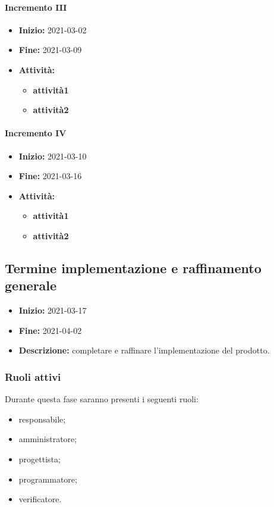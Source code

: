 \paragraph[Incremento III]{Incremento III}
\begin{itemize}
    \item [] \textbf{Inizio:} 2021-03-02
    \item [] \textbf{Fine:} 2021-03-09
    \item [] \textbf{Attività:}
          \begin{itemize}
            \item \textbf{attività1}
            \item \textbf{attività2}
          \end{itemize}
\end{itemize}

\paragraph[Incremento IV]{Incremento IV}
\begin{itemize}
    \item [] \textbf{Inizio:} 2021-03-10
    \item [] \textbf{Fine:} 2021-03-16
    \item [] \textbf{Attività:}
          \begin{itemize}
            \item \textbf{attività1}
            \item \textbf{attività2}
          \end{itemize}
\end{itemize}


\subsection{Termine implementazione e raffinamento generale} \label{_pianificazioneTermineImplementazione}
\begin{itemize}
    \item [] \textbf{Inizio:} 2021-03-17
    \item [] \textbf{Fine:} 2021-04-02
    \item [] \textbf{Descrizione:} completare e raffinare l'implementazione del prodotto.
\end{itemize}

\subsubsection{Ruoli attivi}
Durante questa fase saranno presenti i seguenti ruoli:
\begin{itemize}
    \item responsabile;
    \item amministratore;
    \item progettista;
    \item programmatore;
    \item verificatore.
\end{itemize}

